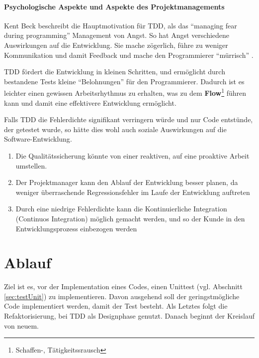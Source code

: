   \paragraph{Psychologische Aspekte und Aspekte des Projektmanagements}

  Kent Beck beschreibt die Hauptmotivation für TDD, als das "`managing fear during programming"' Management von Angst. So hat Angst verschiedene Auswirkungen auf die Entwicklung. Sie mache zögerlich, führe zu weniger Kommunikation und damit Feedback und mache den Programmierer "`mürrisch"' \citep[S. xi]{beck_test_2002}.

  TDD fördert die Entwicklung in kleinen Schritten, und ermöglicht durch bestandene Tests kleine "`Belohnungen"' für den Programmierer. Dadurch ist es leichter einen gewissen Arbeitsrhythmus zu erhalten, was zu dem \textbf{Flow}\footnote{Schaffen-, Tätigkeitssrausch} führen kann\citep{roger_brown_test_2008} und damit eine effektivere Entwicklung ermöglicht.

  Falls TDD die Fehlerdichte signifikant verringern würde und nur Code entstünde, der getestet wurde, so hätte dies wohl auch soziale Auswirkungen auf die Software-Entwicklung\citep[S. x]{beck_test_2002}.
  \begin{enumerate}
   \item Die Qualitätssicherung könnte von einer reaktiven, auf eine proaktive Arbeit umstellen.
   \item Der Projektmanager kann den Ablauf der Entwicklung besser planen, da weniger überraschende Regressionsfehler im Laufe der Entwicklung auftreten
   \item Durch eine niedrige Fehlerdichte kann die Kontinuierliche Integration (Continuos Integration) möglich gemacht werden, und so der Kunde in den Entwicklungsprozess einbezogen werden
  \end{enumerate}



\section{Ablauf}
  Ziel ist es, vor der Implementation eines Codes, einen Unittest (vgl. Abschnitt \ref{sec:testUnit}) zu implementieren. Davon ausgehend soll der geringstmögliche Code implementiert werden, damit der Test besteht. Als Letztes folgt die Refaktorisierung, bei TDD als Designphase genutzt. Danach beginnt der Kreislauf von neuem.

